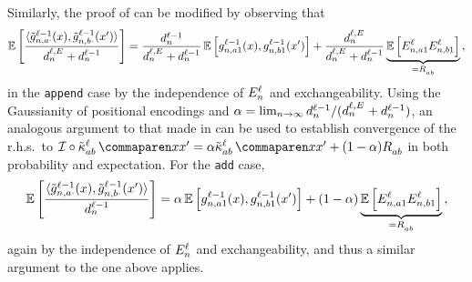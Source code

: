 Similarly, the proof of  can be modified by observing that
\begin{align*}
    \operatorname*{\mathbb{E}} \left[
        \frac{
            \langle {\tilde{g}}^{\ell - 1}_{n, a \cdot}{(x)} , {\tilde{g}}^{\ell - 1}_{n, b \cdot}{(x')} \rangle
        }{
            d_{n}^{\ell, E_{}^{}} + d_{n}^{\ell - 1}
        }
    \right]
    =
    \frac{d_{n}^{\ell - 1}}{d_{n}^{\ell, E_{}^{}} + d_{n}^{\ell - 1}}
    \operatorname*{\mathbb{E}} \left[
        {g}^{\ell - 1}_{n, a 1}{(x)} , {g}^{\ell - 1}_{n, b 1}{(x')} 
    \right]
    +
    \frac{d_{n}^{\ell, E_{}^{}}}{d_{n}^{\ell, E_{}^{}} + d_{n}^{\ell - 1}}
    \underbrace{
        \operatorname*{\mathbb{E}} \left[
            E_{n, a 1}^{\ell}
            E_{n, b 1}^{\ell}
        \right]
    }_{= R_{a b}^{}}
    \, ,
\end{align*}
in the \texttt{append} case by the independence of $E_{n}^{\ell}$ and exchangeability.
Using the Gaussianity of positional encodings and $\alpha = \lim_{n \to \infty}   d_{n}^{\ell - 1} / (d_{n}^{\ell, E_{}^{}} + d_{n}^{\ell - 1})$, an analogous argument to that made in  can be used to establish convergence of the r.h.s.\ to $\interpKern\circ\kerntildef{a b}{\depthSymbol}{\inputSymbol}{\inputSymbol'} = \interpKernCoeff \kerntildef{a b}{\depthSymbol}{\inputSymbol}{\inputSymbol'} + (1 - \interpKernCoeff) \covPosEmb{a b}{}$ in both probability and expectation.
For the \texttt{add} case, 
\begin{align*}
    \operatorname*{\mathbb{E}} \left[
        \frac{
            \langle {\tilde{g}}^{\ell - 1}_{n, a \cdot}{(x)} , {\tilde{g}}^{\ell - 1}_{n, b \cdot}{(x')} \rangle
        }{
            d_{n}^{\ell - 1}
        }
    \right]
    =
    \alpha
    \operatorname*{\mathbb{E}} \left[
        {g}^{\ell - 1}_{n, a 1}{(x)} , {g}^{\ell - 1}_{n, b 1}{(x')} 
    \right]
    +
    (1 - \alpha)
    \underbrace{
        \operatorname*{\mathbb{E}} \left[
            E_{n, a 1}^{\ell}
            E_{n, b 1}^{\ell}
        \right]
    }_{= R_{a b}^{}}
    \, ,
\end{align*}
again by the independence of $E_{n}^{\ell}$ and exchangeability, and thus a similar argument to the one above applies.

